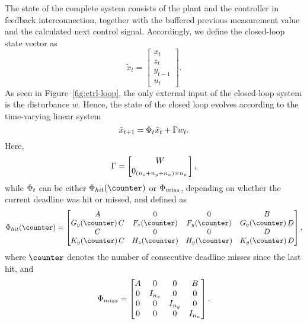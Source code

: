 The state of the complete system consists of the plant and the controller in feedback interconnection, together with the buffered previous measurement value and the calculated next control signal.
Accordingly, we define the closed-loop state vector as
\begin{equation*}
    \tilde{x}_t = \begin{bmatrix} x_t \\ z_t \\ y_{t-1} \\ u_t \end{bmatrix} .
\end{equation*}
As seen in Figure~\ref{fig:ctrl-loop}, the only external input of the closed-loop system is the disturbance $w$.
Hence, the state of the closed loop evolves according to the time-varying linear system
\begin{equation}
    \label{eq:cl-system}
    \tilde{x}_{t+1} = \clmat{}_{t} \tilde{x}_t + \clinp{} w_t.
\end{equation}
Here,
\begin{equation*}
    \Gamma{} = \begin{bmatrix} W \\ 0_{(n_z+n_y+n_u) \times n_w} \end{bmatrix},
\end{equation*}
while $\Phi{}_t$ can be either $\clmat{}_{hit}(\counter)$ or $\Phi{}_{miss}$, depending on whether the current deadline was hit or missed, and defined as
\begin{equation*}
    \clmat{}_{hit}(\counter) = \begin{bmatrix} \Ap & 0 & 0 & \Bp \\
        \Bc_y(\counter) \, \Cp & \Ac_z(\counter) & \Ac_y(\counter) & \Bc_y(\counter) \, \Dp \\
        \Cp & 0 & 0 & \Dp \\
        \Dc_y(\counter) \, \Cp & \Cc_z(\counter) & \Cc_y(\counter) & \Dc_y(\counter) \, \Dp
    \end{bmatrix},
\end{equation*}
where $\counter$ denotes the number of consecutive deadline misses since the last hit, and
\begin{equation*}
    \Phi{}_{miss} = \begin{bmatrix} A & 0 & 0 & B \\
        0 & I_{n_z} & 0 & 0 \\
        0 & 0 & I_{n_y} & 0 \\
    0 & 0 & 0 & I_{n_u} \end{bmatrix}.
\end{equation*}

